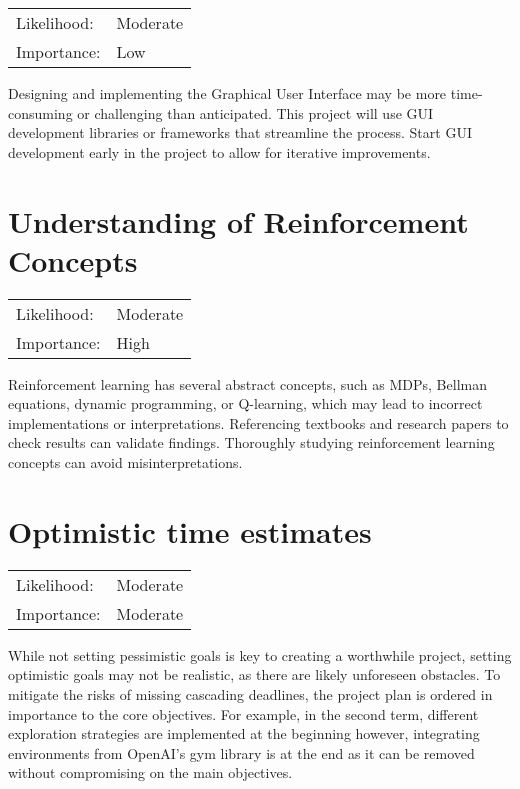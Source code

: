 \documentclass[]{final_report}
\begin{document}
\begin{center}
    \begin{tabular}{l l  }
    Likelihood: & Moderate \\
    Importance: & Low \\
    \end{tabular}
  \end{center}

Designing and implementing the Graphical User Interface may be more time-consuming or challenging than anticipated. This project will use GUI development libraries or frameworks that streamline the process. Start GUI development early in the project to allow for iterative improvements.

\section{Understanding of Reinforcement Concepts}

\begin{center}
    \begin{tabular}{l l  }
    Likelihood: & Moderate \\
    Importance: & High \\
    \end{tabular}
  \end{center}

Reinforcement learning has several abstract concepts, such as MDPs, Bellman equations, dynamic programming, or Q-learning, which may lead to incorrect implementations or interpretations. Referencing textbooks and research papers to check results can validate findings. Thoroughly studying reinforcement learning concepts can avoid misinterpretations.

\section{Optimistic time estimates}

\begin{center}
    \begin{tabular}{l l }
    Likelihood: & Moderate \\
    Importance: & Moderate \\
    \end{tabular}
  \end{center}

While not setting pessimistic goals is key to creating a worthwhile project, setting optimistic goals may not be realistic, as there are likely unforeseen obstacles. To mitigate the risks of missing cascading deadlines, the project plan is ordered in importance to the core objectives. For example, in the second term, different exploration strategies are implemented at the beginning however, integrating environments from OpenAI's gym library\cite{gym} is at the end as it can be removed without compromising on the main objectives.

\newpage



\label{endpage}
\end{document}
